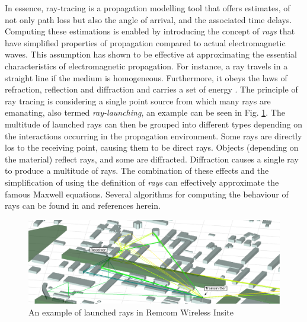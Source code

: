 In essence, ray-tracing is a propagation modelling tool that offers estimates, of not only path loss but also the angle of arrival, and the associated time delays. Computing these estimations is enabled by introducing the concept of \emph{rays} that have simplified properties of propagation compared to actual electromagnetic waves. This assumption has shown to be effective at approximating the essential characteristics of electromagnetic propagation. For instance, a ray travels in a straight line if the medium is homogeneous. Furthermore, it obeys the laws of refraction, reflection and diffraction and carries a set of energy \cite{Yun2015}. 
The principle of ray tracing is considering a single point source from which many rays are emanating, also termed \emph{ray-launching}, an example can be seen in Fig. \ref{fig:raytracing_launching}. The multitude of launched rays can then be grouped into different types depending on the interactions occurring in the propagation environment. Some rays are directly \acrlong{los} to the receiving point, causing them to be direct rays. Objects (depending on the material) reflect rays, and some are diffracted. Diffraction causes a single ray to produce a multitude of rays. The combination of these effects and the simplification of using the definition of \emph{rays} can effectively approximate the famous Maxwell equations.  Several algorithms for computing the behaviour of rays can be found in \cite{Yun2015} and references herein.


\begin{figure}
    \centering
    \includegraphics{chapters/part_pathloss/figures/RemcomRayLaunchingv2.png}
    \caption{An example of launched rays in Remcom Wireless Insite}
    \label{fig:raytracing_launching}
\end{figure}

